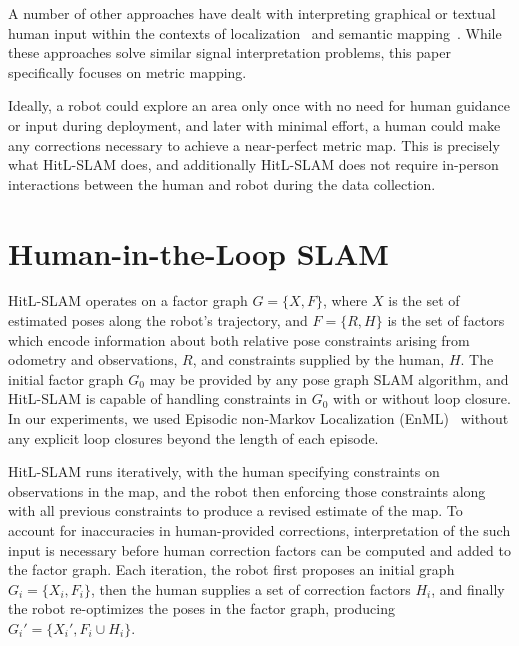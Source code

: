 \documentclass[letterpaper]{article} %
\theoremstyle{definition}
\begin{document}
A number of other approaches have dealt with interpreting graphical or textual human input within the contexts of localization~\cite{behzadian2015monte,boniardi2016autonomous} and semantic mapping~\cite{hemachandra2014information}. While these approaches solve similar signal interpretation problems, this paper specifically focuses on metric mapping.

Ideally, a robot could explore an area only once with no need for human guidance
or input during deployment, and later with minimal effort, a human could make
any corrections necessary to achieve a near-perfect metric map. This is
precisely what HitL-SLAM does, and additionally HitL-SLAM does not
require in-person interactions between the human and robot during the data
collection.

\section{Human-in-the-Loop SLAM}

HitL-SLAM operates on a factor graph $G = \{X, F \}$, where $X$ is the set of estimated
poses along the robot's trajectory, and $F = \{R, H \}$ is the set of factors which encode
information about both relative pose constraints arising from odometry and observations,
$R$, and constraints supplied by the human, $H$. The initial factor graph $G_0$ may be
provided by any pose graph SLAM algorithm, and HitL-SLAM is capable of handling
constraints in $G_0$ with or without loop closure. In our experiments, we used Episodic
non-Markov Localization (EnML)~\cite{biswas2017episodic}  without any explicit loop
closures beyond the length of each episode.

HitL-SLAM runs iteratively, with the human specifying constraints on observations in the
map, and the robot then enforcing those constraints along with all previous constraints to
produce a revised estimate of the map. To account for inaccuracies in human-provided
corrections, interpretation of the such input is necessary before human correction factors
can be computed and added to the factor graph. Each iteration, the robot first proposes an
initial graph $G_i = \{ X_i, F_i \}$, then the human supplies a set of correction factors
$H_i$, and finally the robot re-optimizes the poses in the factor graph, producing $G_i' =
\{ X_i', F_i \cup H_i \}$.
\end{document}
